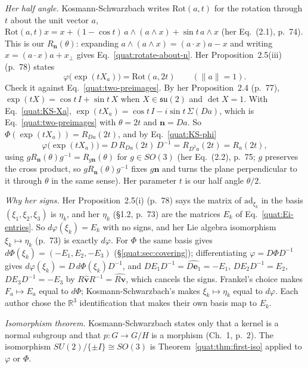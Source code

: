\emph{Her half angle.} Kosmann-Schwarzbach writes $\mathrm{Rot}(a,t)$ for
the rotation through $t$ about the unit vector $a$,
$\mathrm{Rot}(a,t)x=x+(1-\cos t)\,a\wedge(a\wedge x)+\sin t\,a\wedge x$
(her Eq.~(2.1), p.~74). This is our $R_{\mathbf n}(\theta)$: expanding
$a\wedge(a\wedge x)=(a\cdot x)a-x$ and writing $x=(a\cdot x)a+x_\perp$
gives Eq.~\eqref{quat:rotate-about-n}.
Her Proposition~2.5(iii) (p.~78) states
\begin{equation}\label{quat:KS-half-angle}
 \varphi\bigl(\exp(tX_a)\bigr)=\mathrm{Rot}(a,2t)\qquad(\|a\|=1).
\end{equation}
Check it against Eq.~\eqref{quat:two-preimages}. By her Proposition~2.4
(p.~77), $\exp(tX)=\cos t\,I+\sin t\,X$ when $X\in\mathfrak{su}(2)$ and
$\det X=1$. With Eq.~\eqref{quat:KS-Xa},
$\exp(tX_a)=\cos t\,I-i\sin t\,\Sigma(Da)$, which is
Eq.~\eqref{quat:two-preimages} with $\theta=2t$ and $\mathbf n=Da$. So
$\Phi(\exp(tX_a))=R_{Da}(2t)$, and by Eq.~\eqref{quat:KS-phi}
\begin{equation}
 \varphi\bigl(\exp(tX_a)\bigr)=D\,R_{Da}(2t)\,D^{-1}=R_{D^2a}(2t)=R_a(2t),
\end{equation}
using $gR_{\mathbf n}(\theta)g^{-1}=R_{g\mathbf n}(\theta)$ for
$g\in SO(3)$ (her Eq.~(2.2), p.~75; $g$ preserves the cross product, so
$gR_{\mathbf n}(\theta)g^{-1}$ fixes $g\mathbf n$ and turns the plane
perpendicular to it through $\theta$ in the same sense). Her parameter $t$
is our half angle $\theta/2$.

\emph{Why her signs.} Her Proposition~2.5(i) (p.~78) says the matrix of
$\mathrm{ad}_{\xi_k}$ in the basis $(\xi_1,\xi_2,\xi_3)$ is $\eta_k$, and
her $\eta_k$ (\S1.2, p.~73) are the matrices $E_k$ of
Eq.~\eqref{quat:Ei-entries}. So $d\varphi(\xi_k)=E_k$ with no signs, and
her Lie algebra isomorphism $\xi_k\mapsto\eta_k$ (p.~73) is exactly
$d\varphi$. For $\Phi$ the same basis gives
$d\Phi(\xi_k)=(-E_1,E_2,-E_3)$ (\S\ref{quat:sec:covering}); differentiating
$\varphi=D\Phi D^{-1}$ gives $d\varphi(\xi_k)=D\,d\Phi(\xi_k)D^{-1}$, and
$DE_1D^{-1}=\widehat{D\mathbf e_1}=-E_1$, $DE_2D^{-1}=E_2$,
$DE_3D^{-1}=-E_3$ by $R\widehat{\mathbf v}R^{-1}=\widehat{R\mathbf v}$,
which cancels the signs. Frankel's choice makes $F_a\mapsto E_a$ equal to
$d\Phi$; Kosmann-Schwarzbach's makes $\xi_k\mapsto\eta_k$ equal to
$d\varphi$. Each author chose the $\mathbb R^3$ identification that makes
their own basis map to $E_k$.

\emph{Isomorphism theorem.} Kosmann-Schwarzbach states only that a kernel
is a normal subgroup and that $p\colon G\to G/H$ is a morphism (Ch.~1,
p.~2). The isomorphism $SU(2)/\{\pm I\}\cong SO(3)$ is
Theorem~\ref{quat:thm:first-iso} applied to $\varphi$ or $\Phi$.

